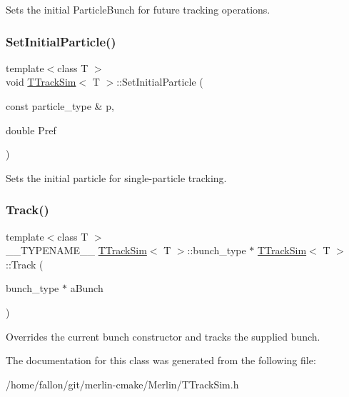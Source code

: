 Sets the initial Particle\+Bunch for future tracking operations. \mbox{\label{classTTrackSim_a3d0fad764b31429f89b7c4d909c0290b}} 
\subsubsection{\texorpdfstring{Set\+Initial\+Particle()}{SetInitialParticle()}}
{\footnotesize\ttfamily template$<$class T $>$ \\
void \hyperlink{classTTrackSim}{T\+Track\+Sim}$<$ T $>$\+::Set\+Initial\+Particle (\begin{DoxyParamCaption}\item[{const particle\+\_\+type \&}]{p,  }\item[{double}]{Pref }\end{DoxyParamCaption})}

Sets the initial particle for single-\/particle tracking. \mbox{\label{classTTrackSim_a6d6155f8aca0466078fddea96da97ca1}} 
\subsubsection{\texorpdfstring{Track()}{Track()}}
{\footnotesize\ttfamily template$<$class T $>$ \\
\+\_\+\+\_\+\+T\+Y\+P\+E\+N\+A\+M\+E\+\_\+\+\_\+ \hyperlink{classTTrackSim}{T\+Track\+Sim}$<$ T $>$\+::bunch\+\_\+type $\ast$ \hyperlink{classTTrackSim}{T\+Track\+Sim}$<$ T $>$\+::Track (\begin{DoxyParamCaption}\item[{bunch\+\_\+type $\ast$}]{a\+Bunch }\end{DoxyParamCaption})}

Overrides the current bunch constructor and tracks the supplied bunch. 

The documentation for this class was generated from the following file\+:\begin{DoxyCompactItemize}
\item 
/home/fallon/git/merlin-\/cmake/\+Merlin/T\+Track\+Sim.\+h\end{DoxyCompactItemize}
